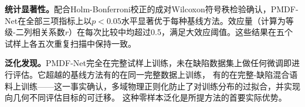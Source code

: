 \textbf{统计显著性。}配合Holm-Bonferroni校正的成对Wilcoxon符号秩检验确认，PMDF-Net在全部三项指标上以$p < 0.05$水平显著优于每种基线方法。效应量（计算为等级-二列相关系数$r$）在每次比较中均超过0.5，满足大效应阈值。这些结果在五个试样上各五次重复扫描中保持一致。

\textbf{泛化发现。}PMDF-Net完全在完整试样上训练，未在缺陷数据集上做任何微调即进行评估。它超越的基线方法有的在同一完整数据上训练，
有的在完整-缺陷混合语料上训练——这一事实确认，多域物理正则化防止了对训练分布的过拟合，并实现向几何不同评估目标的可迁移。
这种零样本泛化是所提方法的首要实际优势。
